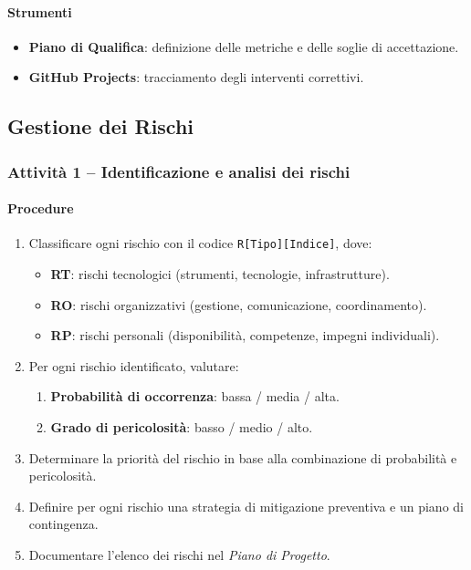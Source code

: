 \documentclass[a4paper, 11pt, oneside]{scrartcl}
\begin{document}
\paragraph{Strumenti}
\begin{itemize}
    \item \textbf{Piano di Qualifica}: definizione delle metriche e delle soglie di accettazione.
    \item \textbf{GitHub Projects}: tracciamento degli interventi correttivi.
\end{itemize}

\subsection{Gestione dei Rischi}

\subsubsection{Attività 1 – Identificazione e analisi dei rischi}

\paragraph{Procedure}
\begin{enumerate}
    \item Classificare ogni rischio con il codice \texttt{R[Tipo][Indice]}, dove:
          \begin{itemize}
              \item \textbf{RT}: rischi tecnologici (strumenti, tecnologie, infrastrutture).
              \item \textbf{RO}: rischi organizzativi (gestione, comunicazione, coordinamento).
              \item \textbf{RP}: rischi personali (disponibilità, competenze, impegni individuali).
          \end{itemize}
    \item Per ogni rischio identificato, valutare:
          \begin{enumerate}[label=\alph*.]
              \item \textbf{Probabilità di occorrenza}: bassa / media / alta.
              \item \textbf{Grado di pericolosità}: basso / medio / alto.
          \end{enumerate}
    \item Determinare la priorità del rischio in base alla combinazione di probabilità e pericolosità.
    \item Definire per ogni rischio una strategia di mitigazione preventiva e un piano di contingenza.
    \item Documentare l'elenco dei rischi nel \emph{Piano di Progetto}{\scriptsize{}}.
\end{enumerate}
\end{document}
